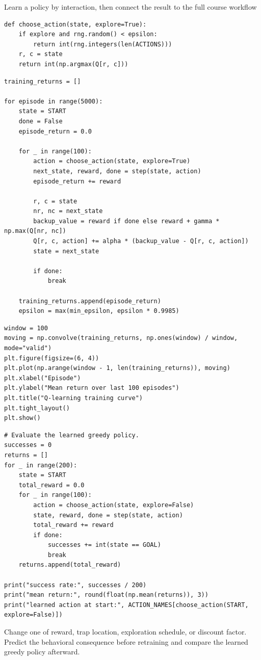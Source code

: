 \begin{labproject}{Learn a policy by interaction, then connect the result to the full course workflow}
\begin{lstlisting}[style=mlpython]
def choose_action(state, explore=True):
    if explore and rng.random() < epsilon:
        return int(rng.integers(len(ACTIONS)))
    r, c = state
    return int(np.argmax(Q[r, c]))
\end{lstlisting}

\begin{lstlisting}[style=mlpython]
training_returns = []

for episode in range(5000):
    state = START
    done = False
    episode_return = 0.0

    for _ in range(100):
        action = choose_action(state, explore=True)
        next_state, reward, done = step(state, action)
        episode_return += reward

        r, c = state
        nr, nc = next_state
        backup_value = reward if done else reward + gamma * np.max(Q[nr, nc])
        Q[r, c, action] += alpha * (backup_value - Q[r, c, action])
        state = next_state

        if done:
            break

    training_returns.append(episode_return)
    epsilon = max(min_epsilon, epsilon * 0.9985)
\end{lstlisting}

\begin{lstlisting}[style=mlpython]
window = 100
moving = np.convolve(training_returns, np.ones(window) / window, mode="valid")
plt.figure(figsize=(6, 4))
plt.plot(np.arange(window - 1, len(training_returns)), moving)
plt.xlabel("Episode")
plt.ylabel("Mean return over last 100 episodes")
plt.title("Q-learning training curve")
plt.tight_layout()
plt.show()
\end{lstlisting}

\begin{lstlisting}[style=mlpython]
# Evaluate the learned greedy policy.
successes = 0
returns = []
for _ in range(200):
    state = START
    total_reward = 0.0
    for _ in range(100):
        action = choose_action(state, explore=False)
        state, reward, done = step(state, action)
        total_reward += reward
        if done:
            successes += int(state == GOAL)
            break
    returns.append(total_reward)

print("success rate:", successes / 200)
print("mean return:", round(float(np.mean(returns)), 3))
print("learned action at start:", ACTION_NAMES[choose_action(START, explore=False)])
\end{lstlisting}

\begin{tryit}
Change one of reward, trap location, exploration schedule, or discount factor. Predict the behavioral consequence before retraining and compare the learned greedy policy afterward.
\end{tryit}
\end{labproject}

